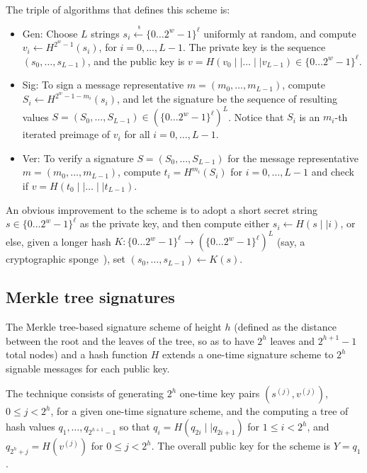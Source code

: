 \documentclass[11pt]{llncs}
\newcommand{\samples}{\stackrel{\;_\$}{\gets}}
\begin{document}
The triple of algorithms that defines this scheme is:
\begin{itemize}
\item \textsf{Gen}: Choose $L$ strings $s_i \samples \{0 \dots 2^w-1\}^\ell$ uniformly at random, and compute $v_i \gets H^{2^w-1}(s_i)$, for $i = 0, \dots, L-1$. The private key is the sequence $(s_0, \dots, s_{L-1})$, and the public key is $v = H(v_0 \mid\mid \dots \mid\mid v_{L-1}) \in \{0 \dots 2^w-1\}^\ell$.
%
\item \textsf{Sig}: To sign a message representative $m = (m_0, \dots, m_{L-1})$, compute $S_i \gets H^{2^w - 1 - m_i}(s_i)$, and let the signature be the sequence of resulting values $S = (S_0, \dots, S_{L-1}) \in (\{0 \dots 2^w-1\}^\ell)^L$. Notice that $S_i$ is an $m_i$-th iterated preimage of $v_i$ for all $i = 0, \dots, L-1$.
%
\item \textsf{Ver}: To verify a signature $S = (S_0, \dots, S_{L-1})$ for the message representative $m = (m_0, \dots, m_{L-1})$, compute $t_i = H^{m_i}(S_i)$ for $i = 0, \dots, L-1$ and check if $v = H(t_0 \mid\mid \dots \mid\mid t_{L-1})$.
\end{itemize}

An obvious improvement to the scheme is to adopt a short secret string $s \in \{0 \dots 2^w-1\}^\ell$ as the private key, and then compute either $s_i \gets H(s \mid\mid i)$, or else, given a longer hash $K: \{0 \dots 2^w-1\}^\ell \rightarrow (\{0 \dots 2^w-1\}^\ell)^L$ (say, a cryptographic sponge~\cite{sponge}), set $(s_0, \dots, s_{L-1}) \gets K(s)$.

\subsection{Merkle tree signatures}

The Merkle tree-based signature scheme of height $h$ (defined as the distance between the root and the leaves of the tree, so as to have $2^h$ leaves and $2^{h+1}-1$ total nodes) and a hash function $H$ extends a one-time signature scheme to $2^h$ signable messages for each public key.

The technique consists of generating $2^h$ one-time key pairs $(s^{(j)}, v^{(j)})$, $0 \leqslant j < 2^h$, for a given one-time signature scheme, and the computing a tree of hash values $q_1, \dots, q_{2^{h+1}-1}$ so that $q_i = H(q_{2i} \mid\mid q_{2i+1})$ for $1 \leqslant i < 2^h$, and $q_{2^h + j} = H(v^{(j)})$ for $0 \leqslant j < 2^h$. The overall public key for the scheme is $Y = q_1$.
\end{document}
